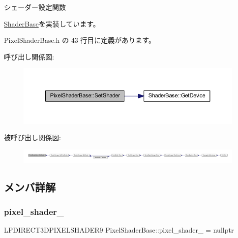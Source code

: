 シェーダー設定関数 



\mbox{\hyperlink{class_shader_base_af45063254b80602db8626360d643baee}{Shader\+Base}}を実装しています。



 Pixel\+Shader\+Base.\+h の 43 行目に定義があります。

呼び出し関係図\+:\nopagebreak
\begin{figure}[H]
\begin{center}
\leavevmode
\includegraphics[width=350pt]{class_pixel_shader_base_a73f41bda5cbb9309ad415cdc471954a2_cgraph}
\end{center}
\end{figure}
被呼び出し関係図\+:
\nopagebreak
\begin{figure}[H]
\begin{center}
\leavevmode
\includegraphics[width=350pt]{class_pixel_shader_base_a73f41bda5cbb9309ad415cdc471954a2_icgraph}
\end{center}
\end{figure}


\subsection{メンバ詳解}
\mbox{\label{class_pixel_shader_base_a5d7213c21268dc57ef82d37a64ff942f}} 
\subsubsection{\texorpdfstring{pixel\+\_\+shader\+\_\+}{pixel\_shader\_}}
{\footnotesize\ttfamily L\+P\+D\+I\+R\+E\+C\+T3\+D\+P\+I\+X\+E\+L\+S\+H\+A\+D\+E\+R9 Pixel\+Shader\+Base\+::pixel\+\_\+shader\+\_\+ = nullptr\hspace{0.3cm}{\ttfamily [private]}}



